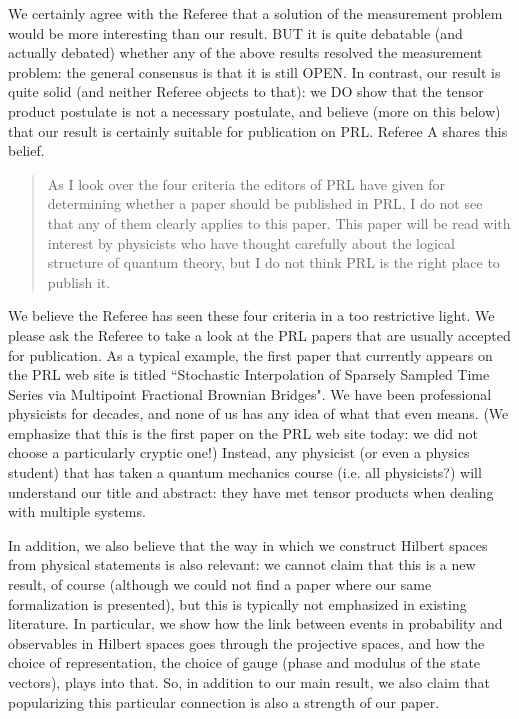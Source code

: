 \documentclass[11pt]{article}
\begin{document}
We certainly agree with the Referee that a solution of the measurement
problem would be more interesting than our result. BUT it is quite
debatable (and actually debated) whether any of the above results
resolved the measurement problem: the general consensus is that it is
still OPEN. In contrast, our result is quite solid (and neither
Referee objects to that): we DO show that the tensor product postulate
is not a necessary postulate, and believe (more on this below) that
our result is certainly suitable for publication on PRL. Referee A
shares this belief.

\begin{quote}
As I look over the four criteria the editors of PRL have
given for determining whether a paper should be published in PRL, I do
not see that any of them clearly applies to this paper. This paper
will be read with interest by physicists who have thought carefully
about the logical structure of quantum theory, but I do not think PRL
is the right place to publish it.
\end{quote}

We believe the Referee has seen these four criteria in a too
restrictive light. We please ask the Referee to take a look at the PRL
papers that are usually accepted for publication. As a typical
example, the first paper that currently appears on the PRL web site is
titled ``Stochastic Interpolation of Sparsely Sampled Time Series via
Multipoint Fractional Brownian Bridges". We have been professional
physicists for decades, and none of us has any idea of what that even
means. (We emphasize that this is the first paper on the PRL web site
today: we did not choose a particularly cryptic one!) Instead, any
physicist (or even a physics student) that has taken a quantum
mechanics course (i.e. all physicists?) will understand our title and
abstract: they have met tensor products when dealing with multiple
systems.

In addition, we also believe that the way in which we construct
Hilbert spaces from physical statements is also relevant: we cannot
claim that this is a new result, of course (although we could not find
a paper where our same formalization is presented), but this is
typically not emphasized in existing literature. In particular, we
show how the link between events in probability and observables in
Hilbert spaces goes through the projective spaces, and how the choice
of representation, the choice of gauge (phase and modulus of the state
vectors), plays into that. So, in addition to our main result, we also
claim that popularizing this particular connection is also a strength
of our paper.
\end{document}
